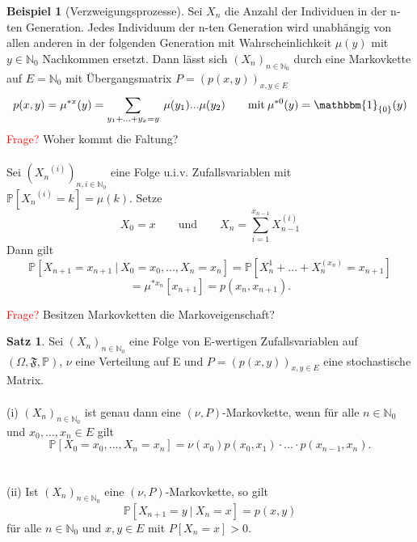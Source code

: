 \documentclass[a4paper,12pt]{scrartcl}
\theoremstyle{definition}
\newtheorem{sat}{Satz}[section]
\newtheorem{bsp}{Beispiel}[section]
\begin{document}
\begin{bsp}[Verzweigungsprozesse]
Sei $X_{n}$ die Anzahl der Individuen in der n-ten Generation. Jedes Individuum der n-ten Generation wird unabhängig von allen anderen in der folgenden Generation mit Wahrscheinlichkeit $\mu(y)$ mit $y \in \mathbb{N}_{0}$ Nachkommen ersetzt. Dann lässt sich $(X_{n})_{n \in \mathbb{N}_{0}}$ durch eine Markovkette auf $E = \mathbb{N}_{0}$ mit Übergangsmatrix $P =(p(x,y))_{x,y \in E}$ 
\begin{equation*}
p(x,y) = \mu^{*x}(y) = \sum_{y_{1} +...+ y_{x} = y} \: \mu(y_{1})... \mu(y_{2}) \qquad \mathrm{mit} \: \mu^{*0}(y) = \mathbbm{1}_{\lbrace 0 \rbrace}(y)
\end{equation*}
\textcolor{red}{Frage?} Woher kommt die Faltung?
\\
\\
Sei $({X_{n}}^{(i)})_{n,i \in \mathbb{N}_{0}}$ eine Folge u.i.v. Zufallsvariablen mit $\mathbb{P}[{X_{n}}^{(i)} = k] = \mu(k)$. Setze
\begin{equation*}
X_{0} = x \qquad  \mathrm{und}  \qquad X_{n} = \sum_{i = 1}^{x_{n-1}} X_{n-1}^{(i)}
\end{equation*}
Dann gilt
\begin{equation*}
\mathbb{P}[X_{n+1} = x_{n+1} \: | \: X_{0} = x_{0},...,X_{n} = x_{n}] = \mathbb{P}[X_{n}^{1}+...+X_{n}^{(x_{n})} = x_{n+1}]
\end{equation*}
\begin{equation*}
= \mu^{*x_{n}}[x_{n+1}] = p(x_{n},x_{n+1}).
\end{equation*}
\end{bsp}
\noindent
\textcolor{red}{Frage?} Besitzen Markovketten die Markoveigenschaft?
\begin{sat}
\label{Besitzen Markovketten die Markoveigenschaft}
Sei ${(X_{n})}_{n \in \mathbb{N}_{0}}$ eine Folge von E-wertigen Zufallsvariablen auf $(\Omega, \mathfrak{F}, \mathbb{P})$, $\nu$ eine Verteilung auf E und $P = (p(x,y))_{x,y \in E}$ eine stochastische Matrix.
\\
\\
(i) ${(X_{n})}_{n \in \mathbb{N}_{0}}$ ist genau dann eine $(\nu,P)$-Markovkette, wenn für alle $n \in \mathbb{N}_{0}$  und $x_{0},...,x_{n} \in E$ gilt
\begin{equation*}
\mathbb{P}[X_{0} = x_{0},...,X_{n} = x_{n}] = \nu(x_{0}) p(x_{0},x_{1}) \cdot ...\cdot p(x_{n-1},x_{n}).
\end{equation*}
\\
\\
(ii) Ist ${(X_{n})}_{n \in \mathbb{N}_{0}}$ eine $(\nu,P)$-Markovkette, so gilt
\begin{equation*}
\mathbb{P}[X_{n+1} = y \: | \: X_{n} = x] = p(x,y)
\end{equation*} 
für alle $n \in \mathbb{N}_{0}$ und $x,y \in E$ mit $P[X_{n} = x]>0$.
\end{sat}
\end{document}
